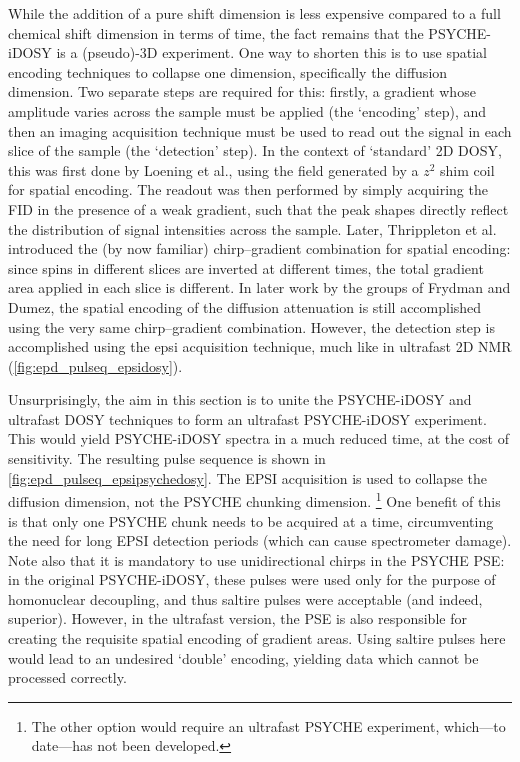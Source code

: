 While the addition of a pure shift dimension is less expensive compared to a full chemical shift dimension in terms of time, the fact remains that the PSYCHE-iDOSY is a (pseudo)-3D experiment.
One way to shorten this is to use spatial encoding techniques to collapse one dimension, specifically the diffusion dimension\autocite{Telkki2021PNMRS}.
Two separate steps are required for this: firstly, a gradient whose amplitude varies across the sample must be applied (the `encoding' step), and then an imaging acquisition technique must be used to read out the signal in each slice of the sample (the `detection' step).
In the context of `standard' 2D DOSY, this was first done by Loening et al.\autocite{Loening2001JMR}, using the field generated by a $z^2$ shim coil for spatial encoding.
The readout was then performed by simply acquiring the FID in the presence of a weak gradient, such that the peak shapes directly reflect the distribution of signal intensities across the sample.
Later, Thrippleton et al.\autocite{Thrippleton2003MRC} introduced the (by now familiar) chirp--gradient combination for spatial encoding: since spins in different slices are inverted at different times, the total gradient area applied in each slice is different.
In later work by the groups of Frydman\autocite{Shrot2008JMR} and Dumez\autocite{Guduff2017CC,Jacquemmoz2022MRC}, the spatial encoding of the diffusion attenuation is still accomplished using the very same chirp--gradient combination.
However, the detection step is accomplished using the \ac{epsi} acquisition technique\autocite{Mansfield1977JPCSSP,Stehling1991S}, much like in ultrafast 2D NMR (\cref{fig:epd_pulseq_epsidosy}).

Unsurprisingly, the aim in this section is to unite the PSYCHE-iDOSY and ultrafast DOSY techniques to form an ultrafast PSYCHE-iDOSY experiment.
This would yield PSYCHE-iDOSY spectra in a much reduced time, at the cost of sensitivity.
The resulting pulse sequence is shown in \cref{fig:epd_pulseq_epsipsychedosy}.
The EPSI acquisition is used to collapse the diffusion dimension, not the PSYCHE chunking dimension.%
\footnote{The other option would require an ultrafast PSYCHE experiment, which---to date---has not been developed.}
One benefit of this is that only one PSYCHE chunk needs to be acquired at a time, circumventing the need for long EPSI detection periods (which can cause spectrometer damage).
Note also that it is mandatory to use unidirectional chirps in the PSYCHE PSE: in the original PSYCHE-iDOSY, these pulses were used only for the purpose of homonuclear decoupling, and thus saltire pulses were acceptable (and indeed, superior).
However, in the ultrafast version, the PSE is also responsible for creating the requisite spatial encoding of gradient areas.
Using saltire pulses here would lead to an undesired `double' encoding, yielding data which cannot be processed correctly.


